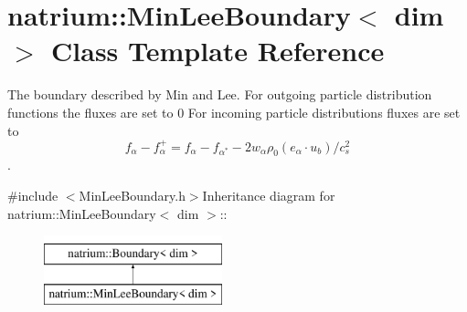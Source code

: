 \hypertarget{classnatrium_1_1MinLeeBoundary}{
\section{natrium::MinLeeBoundary$<$ dim $>$ Class Template Reference}
\label{classnatrium_1_1MinLeeBoundary}
}


The boundary described by Min and Lee. For outgoing particle distribution functions the fluxes are set to 0 For incoming particle distributions fluxes are set to \[ f_{\alpha} - f^{+}_{\alpha} = f_{\alpha} - f_{\alpha^{*}} - 2w_{\alpha} \rho_{0} (e_{\alpha}\cdot u_{b})/c^{2}_{s}\].  


{\ttfamily \#include $<$MinLeeBoundary.h$>$}Inheritance diagram for natrium::MinLeeBoundary$<$ dim $>$::\begin{figure}[H]
\begin{center}
\leavevmode
\includegraphics[height=2cm]{classnatrium_1_1MinLeeBoundary}
\end{center}
\end{figure}
